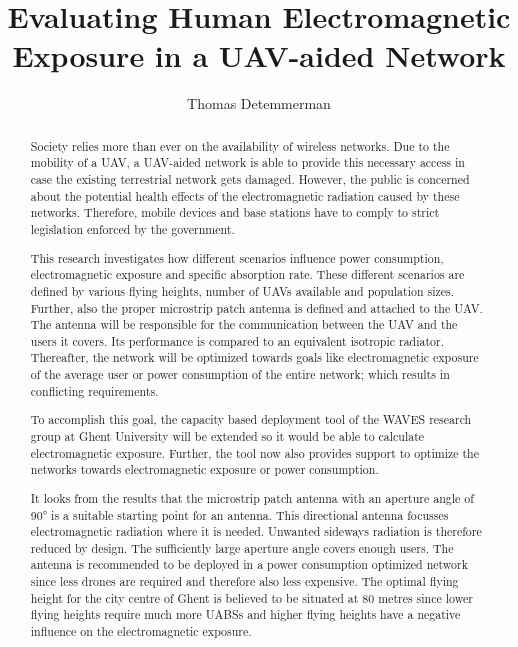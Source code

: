 \documentclass[twocolumn]{phdsymp} %
\begin{document}
\title{Evaluating Human Electromagnetic Exposure in a UAV-aided Network}

\author{Thomas Detemmerman}


\maketitle

\begin{abstract}
  Society relies more than ever on the availability of wireless networks.
  Due to the mobility of a UAV, a UAV-aided network is able to provide this necessary access in case the existing terrestrial network gets damaged.
  However,  the public is 
  concerned about the potential health effects of the electromagnetic radiation caused by these networks.
  Therefore, mobile devices and base stations have to comply to strict legislation enforced by the government.
  
  This research investigates how different scenarios influence power consumption, electromagnetic exposure and specific absorption rate.
  These different scenarios are defined by various flying heights, number of UAVs available and population sizes. Further, also 
  the proper microstrip patch antenna is defined and attached to the UAV. 
  The antenna will be responsible for the communication between the UAV and the users it covers.
  Its performance is compared to  
  an equivalent isotropic radiator.
  Thereafter, the network will be optimized towards goals like electromagnetic exposure of the average user or 
  power consumption of the entire network; which results in conflicting requirements.
  
  To accomplish this goal, the capacity based deployment tool of the WAVES research group at Ghent University
  will be extended so it would be able to calculate electromagnetic exposure.
  Further, the tool now also provides support to optimize the networks towards electromagnetic exposure or power consumption.
  
  It looks from the results that 
  the microstrip patch antenna with an aperture angle of \ang{90} is a suitable starting point for an antenna. 
  This directional antenna focusses electromagnetic radiation where it is needed. Unwanted sideways radiation 
  is therefore reduced by design.
  The sufficiently large aperture angle covers enough users. The antenna is recommended to be deployed in a power consumption 
  optimized network since less drones are required and therefore also less expensive.
  The optimal flying height for the city centre of Ghent is believed to be situated at 80 metres since lower flying heights require much more UABSs and
  higher flying heights have a negative influence on the electromagnetic exposure.  
\end{abstract}
\end{document}
